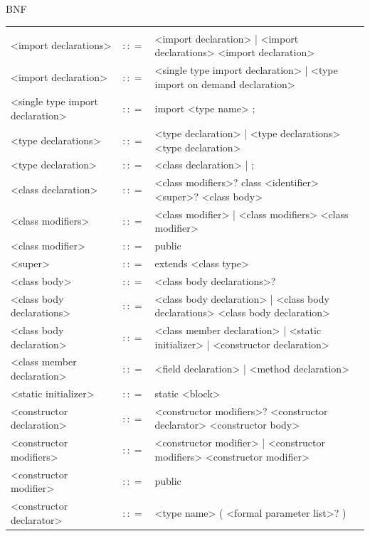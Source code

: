 \documentclass[landscape, 11pt]{article}
\begin{document}
\begin{qsection}{BNF}
\begin{enumerate}[label=\bt{\theenumi.}]
			\begin{longtable}{R{7cm} c L{15cm}}
													&					&	 \\
				<import declarations>						&	$\colon\colon=$	&	<import declaration> | <import declarations> <import declaration>
				\\
				<import declaration>						&	$\colon\colon=$	&	<single type import declaration> | <type import on demand declaration>
				\\
				<single type import declaration>			&	$\colon\colon=$	&	import <type name> ;
				\\
				<type declarations>							&	$\colon\colon=$	&	<type declaration> | <type declarations> <type declaration>
				\\
				<type declaration>							&	$\colon\colon=$	&	<class declaration> | ;
				\\
				<class declaration>							&	$\colon\colon=$	&	<class modifiers>? class <identifier> <super>? <class body>
				\\
				<class modifiers>							&	$\colon\colon=$	&	<class modifier> | <class modifiers> <class modifier>
				\\
				<class modifier>							&	$\colon\colon=$	&	public
				\\
				<super>										&	$\colon\colon=$	&	extends <class type>
				\\
				<class body>								&	$\colon\colon=$	&	{ <class body declarations>? }
				\\
				<class body declarations>					&	$\colon\colon=$	&	<class body declaration> | <class body declarations> <class body declaration>
				\\
				<class body declaration>					&	$\colon\colon=$	&	<class member declaration> | <static initializer> | <constructor declaration>
				\\
				<class member declaration>					&	$\colon\colon=$	&	<field declaration> | <method declaration>
				\\
				<static initializer>						&	$\colon\colon=$	&	static <block>
				\\
				<constructor declaration>					&	$\colon\colon=$	&	<constructor modifiers>? <constructor declarator> <constructor body>
				\\
				<constructor modifiers>						&	$\colon\colon=$	&	<constructor modifier> | <constructor modifiers> <constructor modifier>
				\\
				<constructor modifier>						&	$\colon\colon=$	&	public
				\\
				<constructor declarator>					&	$\colon\colon=$	&	<type name> ( <formal parameter list>? )

\end{longtable}
\end{enumerate}
\end{qsection}
\end{document}
